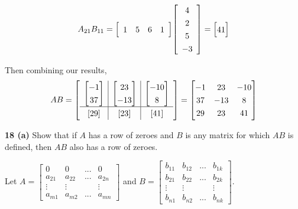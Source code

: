 \documentclass[addpoints]{exam}
\begin{document}
\begin{sloppypar}
\begin{questions}
\begin{solution}
        \[ A_{21}B_{11} = \renewcommand\arraystretch{1.3}
        \mleft[ 
        \begin{array}{cccc}
            1 & 5 & 6 & 1
        \end{array}
        \mright] \renewcommand\arraystretch{1.3}
        \mleft[
        \begin{array}{c}
            4 \\ 2 \\ 5 \\ -3
        \end{array}
        \mright] = \begin{bmatrix}
            41
        \end{bmatrix}\]

        Then combining our results, \[ 
        AB = \renewcommand\arraystretch{1.3}
        \mleft[ 
        \begin{array}{c|c|c}
            \begin{bmatrix} -1 \\ 37 \end{bmatrix} & \begin{bmatrix} 23 \\ -13 \end{bmatrix} & \begin{bmatrix} -10 \\ 8 \end{bmatrix} \\ 
            \hline
            [29] & [23] & [41]
        \end{array}
        \mright]  = \begin{bmatrix}
            -1 & 23 & -10 \\ 
            37 & -13 & 8 \\ 
            29 & 23 & 41
        \end{bmatrix}
        \]
    \end{solution}

    \question
    \textbf{18 (a)} Show that if $A$ has a row of zeroes and $B$ is any matrix for which $AB$ is defined, then $AB$ also has a row of zeroes. 
    \begin{solution}
        
        Let $A = \begin{bmatrix}
            0 & 0 & ... & 0 \\ 
            a_{21} & a_{22} & ... & a_{2n} \\ 
            \vdots & \vdots & & \vdots \\
            a_{m1} & a_{m2} & ... & a_{mn} 
        \end{bmatrix}$ and $ B = \begin{bmatrix}
            b_{11} & b_{12} & ... & b_{1k} \\ 
            b_{21} & b_{22} & ... & b_{2k} \\ 
            \vdots & \vdots & & \vdots \\ 
            b_{n1} & b_{n2} & ... & b_{nk}
        \end{bmatrix} $.


\end{solution}
\end{questions}
\end{sloppypar}
\end{document}
